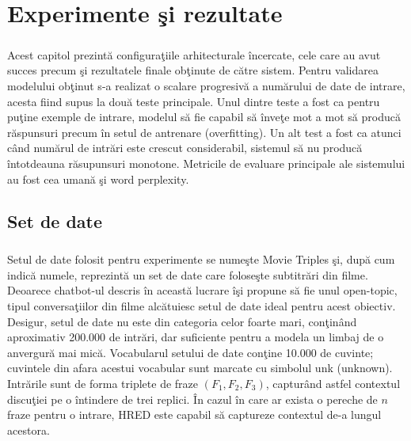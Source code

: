 \chapter{Experimente \c si rezultate}

\paragraph{}
Acest capitol prezint\u a configura\c tiile arhitecturale \^ incercate, cele care au avut succes precum \c si rezultatele finale ob\c tinute de c\u atre sistem. Pentru validarea modelului ob\c tinut s-a realizat o scalare progresiv\u a a num\u arului de date de intrare, acesta fiind supus la dou\u a teste principale. Unul dintre teste a fost ca pentru pu\c tine exemple de intrare, modelul s\u a fie capabil s\u a \^ inve\c te mot a mot s\u a produc\u a r\u aspunsuri precum \^ in setul de antrenare (overfitting). Un alt test a fost ca atunci c\^ and num\u arul de intr\u ari este crescut considerabil, sistemul s\u a nu produc\u a \^ intotdeauna r\u asupunsuri monotone. Metricile de evaluare principale ale sistemului au fost cea uman\u a \c si word perplexity.

\section{Set de date}

\paragraph{}
Setul de date folosit pentru experimente se nume\c ste Movie Triples \c si, dup\u a cum indic\u a numele, reprezint\u a un set de date care folose\c ste subtitr\u ari din filme. Deoarece chatbot-ul descris \^ in aceast\u a lucrare \^ i\c si propune s\u a fie unul open-topic, tipul conversa\c tiilor din filme alc\u atuiesc setul de date ideal pentru acest obiectiv. Desigur, setul de date nu este din categoria celor foarte mari, con\c tin\^ and aproximativ 200.000 de intr\u ari, dar suficiente pentru a modela un limbaj de o anvergur\u a mai mic\u a. Vocabularul setului de date con\c tine 10.000 de cuvinte; cuvintele din afara acestui vocabular sunt marcate cu simbolul unk (unknown). Intr\u arile sunt de forma triplete de fraze \((F_1, F_2, F_3)\), captur\^ and astfel contextul discu\c tiei pe o \^ intindere de trei replici. \^ In cazul \^ in care ar exista o pereche de \(n\) fraze pentru o intrare, HRED este capabil s\u a captureze contextul de-a lungul acestora.


